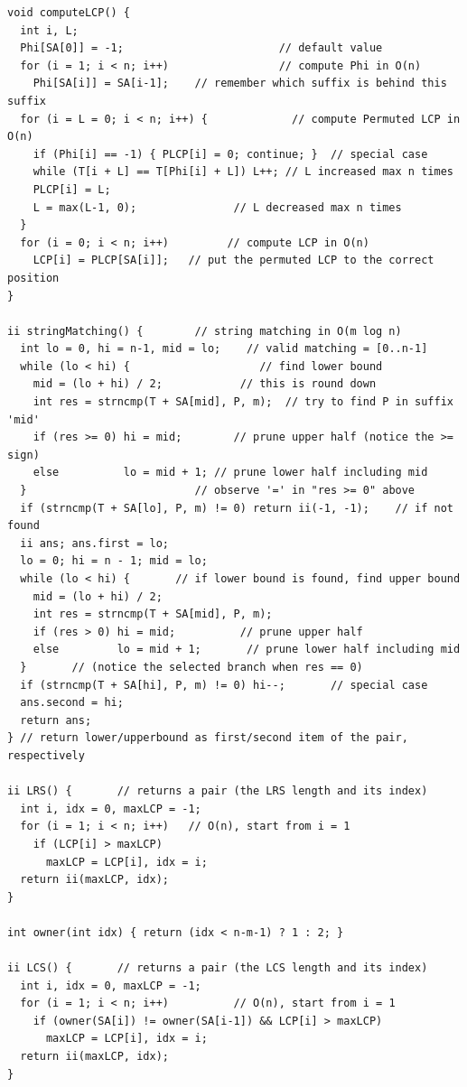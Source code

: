 \documentclass[10pt,landscape]{article}
\begin{document}
\begin{multicols}{2}
\begin{lstlisting}
void computeLCP() {
  int i, L;
  Phi[SA[0]] = -1;                        // default value
  for (i = 1; i < n; i++)                 // compute Phi in O(n)
    Phi[SA[i]] = SA[i-1];    // remember which suffix is behind this suffix
  for (i = L = 0; i < n; i++) {             // compute Permuted LCP in O(n)
    if (Phi[i] == -1) { PLCP[i] = 0; continue; }  // special case
    while (T[i + L] == T[Phi[i] + L]) L++; // L increased max n times
    PLCP[i] = L;
    L = max(L-1, 0);               // L decreased max n times
  }
  for (i = 0; i < n; i++)         // compute LCP in O(n)
    LCP[i] = PLCP[SA[i]];   // put the permuted LCP to the correct position
}

ii stringMatching() {        // string matching in O(m log n)
  int lo = 0, hi = n-1, mid = lo;    // valid matching = [0..n-1]
  while (lo < hi) {                    // find lower bound
    mid = (lo + hi) / 2;            // this is round down
    int res = strncmp(T + SA[mid], P, m);  // try to find P in suffix 'mid'
    if (res >= 0) hi = mid;        // prune upper half (notice the >= sign)
    else          lo = mid + 1; // prune lower half including mid
  }                          // observe '=' in "res >= 0" above
  if (strncmp(T + SA[lo], P, m) != 0) return ii(-1, -1);    // if not found
  ii ans; ans.first = lo;
  lo = 0; hi = n - 1; mid = lo;
  while (lo < hi) {       // if lower bound is found, find upper bound
    mid = (lo + hi) / 2;
    int res = strncmp(T + SA[mid], P, m);
    if (res > 0) hi = mid;          // prune upper half
    else         lo = mid + 1;       // prune lower half including mid
  }       // (notice the selected branch when res == 0)
  if (strncmp(T + SA[hi], P, m) != 0) hi--;       // special case
  ans.second = hi;
  return ans;
} // return lower/upperbound as first/second item of the pair, respectively

ii LRS() {       // returns a pair (the LRS length and its index)
  int i, idx = 0, maxLCP = -1;
  for (i = 1; i < n; i++)   // O(n), start from i = 1
    if (LCP[i] > maxLCP)
      maxLCP = LCP[i], idx = i;
  return ii(maxLCP, idx);
}

int owner(int idx) { return (idx < n-m-1) ? 1 : 2; }

ii LCS() {       // returns a pair (the LCS length and its index)
  int i, idx = 0, maxLCP = -1;
  for (i = 1; i < n; i++)          // O(n), start from i = 1
    if (owner(SA[i]) != owner(SA[i-1]) && LCP[i] > maxLCP)
      maxLCP = LCP[i], idx = i;
  return ii(maxLCP, idx);
}
\end{lstlisting}

\end{multicols}
\end{document}
